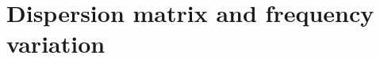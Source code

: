 \documentclass[11pt]{article}
\begin{document}


\section{Dispersion matrix and frequency variation}
\label{sec:dispersion}
\end{document}
